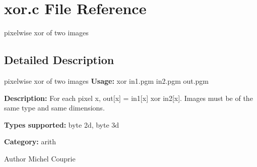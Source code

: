 \section{xor.c File Reference}
\label{xor_8c}


pixelwise xor of two images  




\subsection{Detailed Description}
pixelwise xor of two images {\bfseries Usage:} xor in1.pgm in2.pgm out.pgm

{\bfseries Description:} For each pixel x, out[x] = in1[x] xor in2[x]. Images must be of the same type and same dimensions.

{\bfseries Types supported:} byte 2d, byte 3d

{\bfseries Category:} arith

\begin{DoxyAuthor}{Author}
Michel Couprie 
\end{DoxyAuthor}

